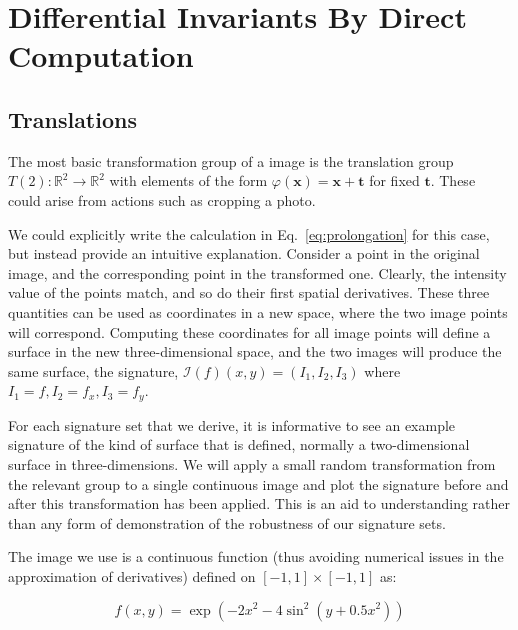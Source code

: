 \documentclass{artjlt}
\begin{document}

\section{Differential Invariants By Direct Computation}

\subsection{Translations}
\label{sec:T2}

The most basic transformation group of a image is the translation group
$T(2) \colon \mathbb{R}^2 \to \mathbb{R}^2$ with elements of the form
$\varphi(\mathbf{x}) = \mathbf{x} + \mathbf{t}$ for fixed $\mathbf{t}$.
These could arise from actions such as cropping a photo.

We could explicitly write the calculation in Eq.~\ref{eq:prolongation} for
this case, but instead provide an intuitive explanation. Consider a point
in the original image, and the corresponding point in the transformed one.
Clearly, the intensity value of the points match, and so do their first
spatial derivatives. These three quantities can be used as coordinates in a
new space, where the two image points will correspond. Computing these
coordinates for all image points will define a surface in the new
three-dimensional space, and the two images will produce the same surface,
the signature, $\mathcal{I}(f)(x, y) = \left(I_1, I_2,
I_3\right)$ where $I_1 = f, I_2 = f_x, I_3 = f_y$.

For each signature set that we derive, it is informative to see an example signature of the kind of surface that is defined, 
normally a two-dimensional surface in three-dimensions.  We will apply a small random transformation from 
the relevant group to a single continuous image and plot the signature before and after this transformation has been applied.
This is an aid to understanding rather than any form of demonstration of the robustness of our signature sets.

The image we use is a continuous function (thus avoiding numerical issues in the approximation 
of derivatives) defined on $[-1,1] \times [-1,1]$ as:

\begin{equation}\label{eq:function}
f(x, y) = \exp(-2x^2 - 4\sin^2(y + 0.5x^2))
\end{equation}
\end{document}
